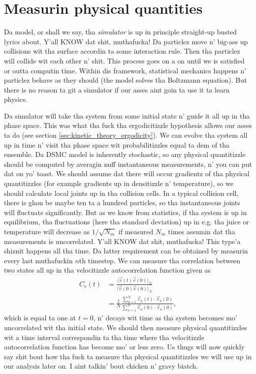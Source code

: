 \section{Measurin physical quantities}
\label{sec:dsmc_measuring_physical_quantities}
Da model, or shall we say, tha \textit{simulator} is up in principle straight-up busted lyrics about. Y'all KNOW dat shit, muthafucka! Da particlez move n' big-ass up collisions wit tha surface accordin ta some interaction rule. Then tha particlez will collide wit each other n' shit. This process goes on a on until we is satisfied or outta computin time. Within dis framework, statistical mechanics happens n' particlez behave as they should (the model solves tha Boltzmann equation). But there is no reason ta git a simulator if our asses aint goin ta use it ta learn physics.

Da simulator will take tha system from some initial state n' guide it all up in tha phase space. This was what tha fuck tha ergodicitizzle hypothesis allows our asses ta do (see section \ref{sec:kinetic_theory_ergodicity}). We can evolve tha system all up in time n' visit tha phase space wit probabilitizzles equal ta dem of tha ensemble. Da DSMC model is inherently stochastic, so any physical quantitizzle should be computed by averagin nuff instantaneous measurements, n' you can put dat on yo' toast. We should assume dat there will occur gradientz of tha physical quantitizzles (for example gradients up in densitizzle n' temperature), so we should calculate local joints up in tha collision cells. In a typical collision cell, there is ghon be maybe ten ta a hundred particles, so tha instantaneous joints will fluctuate significantly. But as we know from statistics, if tha system is up in equilibrium, tha fluctuations (here tha standard deviation) up in e.g. tha juice or temperature will decrease as $1/\sqrt{N_m}$ if measured $N_m$ times assumin dat tha measurements is uncorrelated. Y'all KNOW dat shit, muthafucka! This type'a shiznit happens all tha time. Da latter requirement can be obtained by measurin every last muthafuckin $n$th timestep. We can measure tha correlation between two states all up in tha velocitizzle autocorrelation function given as
\begin{align}
	C_v(t) &= \frac{\langle \vec v(t)\vec v(0)\rangle_N}{\langle \vec v(0)\vec v(0)\rangle_N}\\
	&= \frac{1}{N}\frac{\sum_{n=1}^N \vec v_n(t)\cdot\vec v_n(0)}{\sum_{n=1}^N \vec v_n(0)\cdot\vec v_n(0)},
\end{align}
which is equal ta one at $t=0$, n' decays wit time as tha system becomes mo' uncorrelated wit tha initial state. We should then measure physical quantitizzles wit a time interval correspondin ta tha time where tha velocitizzle autocorrelation function has become mo' or less zero. Us thugs will now quickly say shit bout how tha fuck ta measure tha physical quantitizzles we will use up in our analysis later on. I aint talkin' bout chicken n' gravy biatch. 
